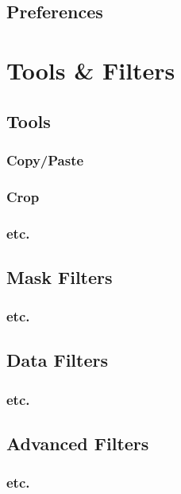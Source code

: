 \documentclass[fleqn,11pt,openany]{book}
\begin{document}
\section{Preferences}

\chapter{Tools \& Filters}

\begin{introduction}

\end{introduction}

\section{Tools}

\subsection{Copy/Paste}

\subsection{Crop}

\subsection{etc.}

\section{Mask Filters}

\subsection{etc.}

\section{Data Filters}

\subsection{etc.}

\section{Advanced Filters}

\subsection{etc.}
\end{document}
